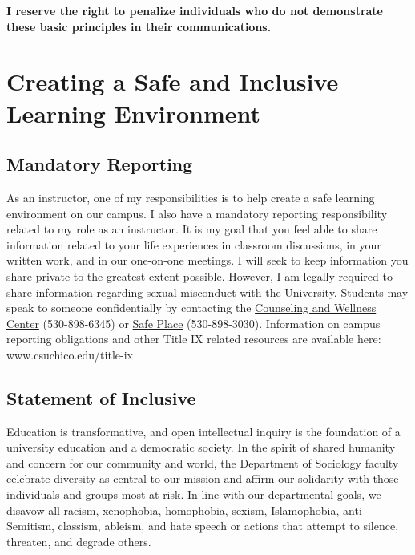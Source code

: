 \documentclass[11pt,]{article}
\begin{document}
\textbf{I reserve the right to penalize individuals who do not
demonstrate these basic principles in their communications.}

\hypertarget{creating-a-safe-and-inclusive-learning-environment}{%
\section{Creating a Safe and Inclusive Learning
Environment}\label{creating-a-safe-and-inclusive-learning-environment}}

\hypertarget{mandatory-reporting}{%
\subsection{Mandatory Reporting}\label{mandatory-reporting}}

As an instructor, one of my responsibilities is to help create a safe
learning environment on our campus. I also have a mandatory reporting
responsibility related to my role as an instructor. It is my goal that
you feel able to share information related to your life experiences in
classroom discussions, in your written work, and in our one-on-one
meetings. I will seek to keep information you share private to the
greatest extent possible. However, I am legally required to share
information regarding sexual misconduct with the University. Students
may speak to someone confidentially by contacting the
\href{https://www.csuchico.edu/counseling/}{Counseling and Wellness
Center} (530-898-6345) or
\href{https://www.csuchico.edu/safeplace/}{Safe Place} (530-898-3030).
Information on campus reporting obligations and other Title IX related
resources are available here: www.csuchico.edu/title-ix

\hypertarget{statement-of-inclusive}{%
\subsection{Statement of Inclusive}\label{statement-of-inclusive}}

Education is transformative, and open intellectual inquiry is the
foundation of a university education and a democratic society. In the
spirit of shared humanity and concern for our community and world, the
Department of Sociology faculty celebrate diversity as central to our
mission and affirm our solidarity with those individuals and groups most
at risk. In line with our departmental goals, we disavow all racism,
xenophobia, homophobia, sexism, Islamophobia, anti-Semitism, classism,
ableism, and hate speech or actions that attempt to silence, threaten,
and degrade others.
\end{document}
